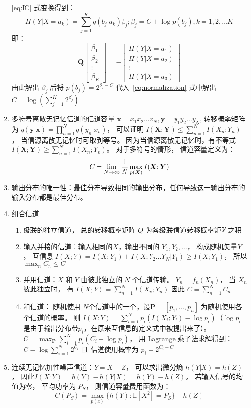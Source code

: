 \documentclass{article}
\def\E{\mathbb{E}}
\begin{document}
\begin{enumerate}
\eqref{eq:IC} 式变换得到：
\begin{equation*}
    H(Y | X = a_k) = \sum_{j=1}^K q(b_j | a_k) \beta_j; \beta_j = C + \log p(b_j), k = 1, 2,\dots K
\end{equation*}
即：
$$
\bm{Q} \begin{bmatrix} \beta_1 \\ \beta_2 \\ \vdots \\ \beta_K \end{bmatrix} 
    = - \begin{bmatrix} H(Y|X = a_1) \\ H(Y|X = a_2) \\ \vdots \\ H(Y|X = a_3) \end{bmatrix} 
$$
由此解出 $\beta_j$ 后将 $p(b_j) = 2^{\beta_j - C}$ 代入~\eqref{eq:normalization} 式中解出
$ C =\log\left(\sum_{j=1}^K 2^{\beta_j}\right)$
\item 多符号离散无记忆信道的信道容量
$ \bm{x} = x_1x_2\dots x_N, \bm{y} = y_1y_2\dots y_N$, 转移概率矩阵为
$ q(\bm{y} | \bm{x}) = \prod_{n = 1}^N q(y_n | x_n)$，
可以证明 $I(\bm{X}; \bm{Y}) \leq \sum_{n = 1}^N I(X_n; Y_n)$， 当信源离散无记忆时可取到等号。
因为当信源离散无记忆时，有不等式 $I(\bm{X}; \bm{Y}) \geq \sum_{n = 1}^N I(X_n; Y_n)$。
对于多符号的情形， 信道容量定义为：
$$
C = \lim_{N \to \infty} {1 \over N} \max_{p(\bm{X})} I(\bm{X}; \bm{Y})
$$
\item 输出分布的唯一性：最佳分布导致相同的输出分布，任何导致这一输出分布的输入分布都是最佳分布。
\item 组合信道
\begin{enumerate}[label=(\alph*)]
    \item 级联的独立信道， 总的转移概率矩阵 $Q$ 为各级联信道转移概率矩阵之积
    \item 输入并接的信道：输入相同的$X$，输出不同的 $Y_1, Y_2, \dots $， 构成随机矢量$Y$。
    互信息 $ I(X;Y) = I(X; Y_1) + I(X; Y_2\dots Y_N | Y_1) \geq I(X; Y_1)$， 所以
    $ \max_n C_n \leq C $
    \item 并用信道：$X$ 和 $Y$ 由彼此独立的 $N$ 个信道传输。
    $Y_n = f_n (X_n)$， 当 $X_n$ 彼此独立时， 有 $ I(X; Y) = \sum_{n=1}^N I(X_n; Y_n)$
    因此 $C = \sum_{n=1}^N C_n$
    \item 和信道： 随机使用 $N$个信道中的一个，设$\bm{P} = [p_1, \dots, p_n]$ 为随机使用各个信道的概率。
    则 $I(X; Y) = \sum_{i=1}^N p_i (I(X_i; Y_i)-\log p_i)$（$\log p_i $ 是由于输出分布带$p_i$，在原来互信息的定义式中被提出来了）。
    $ C = \max_{\bm{P}} \sum_{i=1}^N p_i (C_i - \log p_i)$， 用 Lagrange 乘子法求解得到：
$ C = \log \sum_{i=1}^N 2^{C_i}$ 且 信道使用概率为 $p_i = 2^{C_i - C}$
\end{enumerate}
\item 连续无记忆加性噪声信道：$ Y = X + Z$， 可以求出微分熵 $h(Y|X) = h(Z)$，
因此$I(X; Y) = h(Y) - h(Y|X) = h(Y) - h(Z)$。
若输入信号的均值为零， 平均功率为 $P_S$， 则信道容量费用函数为：
$$C(P_S) = \max_{p(x)}\{h(Y):\E[X^2] = P_S\} - h(Z)$$


\end{enumerate}
\end{document}
